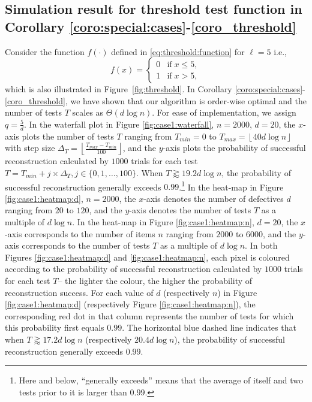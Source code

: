 \documentclass[onecolumn,letterpaper]{IEEEtran}
\newcommand{\ts}{{\ell}}
\newcommand{\cp}{{q}}
\newcommand{\tmin}{T_{min}}
\newcommand{\tmax}{T_{max}}
\newcommand{\tgap}{\Delta_T}
\newcommand{\vari}{j}
\begin{document}
\subsection{ Simulation result for threshold test function in Corollary \ref{coro:special:cases}-\ref{coro_threshold}}
Consider the function $f(\cdot)$ defined in \eqref{eq:threshold:function} for $\ts = 5$ i.e., 
\begin{equation} \label{eq:threshold_L=5}
    f(x) = 
    \left\{
    \begin{array}{ll}
    0 & \text{if} \; x \le 5, \\
    1 & \text{if} \; x > 5,
    \end{array} 
    \right.
\end{equation}
which is also illustrated in Figure~\ref{fig:threshold}. In Corollary \ref{coro:special:cases}-\ref{coro_threshold}, we have shown that our algorithm is order-wise optimal and the number of tests $T$ scales as $\Theta (d \log n)$. For ease of implementation, we assign $\cp = \frac{5}{d}$. In the waterfall plot in Figure \ref{fig:case1:waterfall}, $n=2000$, $d=20$, the $x$-axis plots the number of tests $T$ ranging from $\tmin = 0$ to $\tmax = \left\lfloor 40d \log n  \right\rfloor$ with step size $\tgap = \left\lfloor \frac{\tmax - \tmin}{100} \right\rfloor$, and the $y$-axis plots the probability of successful reconstruction calculated by $1000$ trials for each test $ T = \tmin + \vari \times \tgap , \vari \in \{0,1,\dots,100\}$. When $T \gtrapprox 19.2d\log n $, the probability of successful reconstruction generally exceeds $0.99$.\footnote{Here and below, ``generally exceeds'' means that the average of itself and two tests prior to it is larger than $0.99$.} In the heat-map in Figure \ref{fig:case1:heatmap:d}, $n=2000$, the $x$-axis denotes the number of defectives $d$ ranging from $20$ to $120$, and the $y$-axis denotes the number of tests $T$ as a multiple of $d\log n $. In the heat-map in Figure \ref{fig:case1:heatmap:n}, $d=20$, the $x$-axis corresponds to the number of items $n$ ranging from $2000$ to $6000$, and the $y$-axis corresponds to the number of tests $T$ as a multiple of $d\log n $. In both Figures \ref{fig:case1:heatmap:d} and \ref{fig:case1:heatmap:n}, each pixel is coloured according to the probability of successful reconstruction calculated by $1000$ trials for each test $T$-- the lighter the colour, the higher the probability of reconstruction success. For each value of $d$ (respectively $n$) in Figure \ref{fig:case1:heatmap:d} (respectively Figure \ref{fig:case1:heatmap:n}), the corresponding red dot in that column represents the number of tests for which this probability first equals $0.99$. The horizontal blue dashed line indicates that when $T \gtrapprox 17.2d\log n $ (respectively $20.4d\log n $), the probability of successful reconstruction generally exceeds $0.99$.
\end{document}
